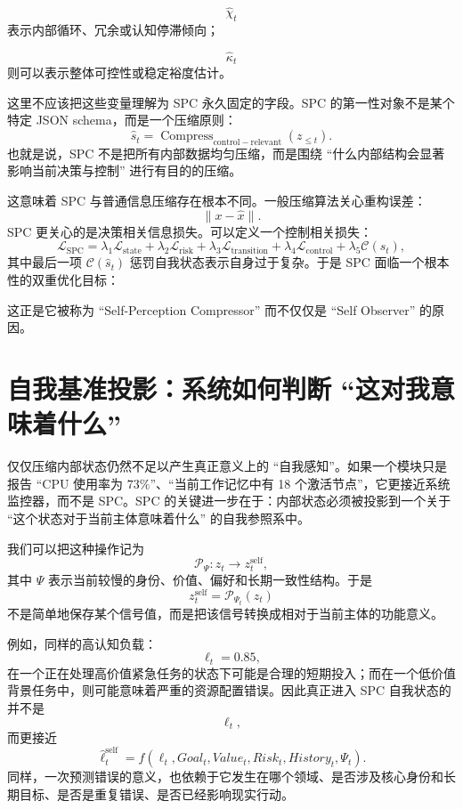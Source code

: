 \[
\hat{\chi}_t
\]
表示内部循环、冗余或认知停滞倾向；

\[
\hat{\kappa}_t
\]
则可以表示整体可控性或稳定裕度估计。

这里不应该把这些变量理解为 SPC 永久固定的字段。SPC 的第一性对象不是某个特定 JSON schema，而是一个压缩原则：
\[
\boxed{
\hat{s}_t
=
\operatorname{Compress}_{\mathrm{control-relevant}}
\left(
z_{\leq t}
\right).
}
\]
也就是说，SPC 不是把所有内部数据均匀压缩，而是围绕 ``什么内部结构会显著影响当前决策与控制'' 进行有目的的压缩。

这意味着 SPC 与普通信息压缩存在根本不同。一般压缩算法关心重构误差：
\[
\|x-\hat{x}\|.
\]
SPC 更关心的是决策相关信息损失。可以定义一个控制相关损失：
\[
\mathcal L_{\mathrm{SPC}}
=
\lambda_1
\mathcal L_{\mathrm{state}}
+
\lambda_2
\mathcal L_{\mathrm{risk}}
+
\lambda_3
\mathcal L_{\mathrm{transition}}
+
\lambda_4
\mathcal L_{\mathrm{control}}
+
\lambda_5
\mathcal C(\hat{s}_t),
\]
其中最后一项 $\mathcal C(\hat{s}_t)$ 惩罚自我状态表示自身过于复杂。于是 SPC 面临一个根本性的双重优化目标：
\begin{statementbox}
\centering
{}
\end{statementbox}
这正是它被称为 ``Self-Perception Compressor'' 而不仅仅是 ``Self Observer'' 的原因。

\section{自我基准投影：系统如何判断 ``这对我意味着什么''}

仅仅压缩内部状态仍然不足以产生真正意义上的 ``自我感知''。如果一个模块只是报告 ``CPU 使用率为 $73\%$''、``当前工作记忆中有 18 个激活节点''，它更接近系统监控器，而不是 SPC。SPC 的关键进一步在于：内部状态必须被投影到一个关于 ``这个状态对于当前主体意味着什么'' 的自我参照系中。

我们可以把这种操作记为
\[
\mathcal P_{\Psi}:
z_t
\longrightarrow
z_t^{\mathrm{self}},
\]
其中 $\Psi$ 表示当前较慢的身份、价值、偏好和长期一致性结构。于是
\[
z_t^{\mathrm{self}}
=
\mathcal P_{\Psi_t}
\left(
z_t
\right)
\]
不是简单地保存某个信号值，而是把该信号转换成相对于当前主体的功能意义。

例如，同样的高认知负载：
\[
\ell_t=0.85,
\]
在一个正在处理高价值紧急任务的状态下可能是合理的短期投入；而在一个低价值背景任务中，则可能意味着严重的资源配置错误。因此真正进入 SPC 自我状态的并不是
\[
\ell_t,
\]
而更接近
\[
\hat{\ell}^{\mathrm{self}}_t
=
f(
\ell_t,
Goal_t,
Value_t,
Risk_t,
History_t,
\Psi_t
).
\]
同样，一次预测错误的意义，也依赖于它发生在哪个领域、是否涉及核心身份和长期目标、是否是重复错误、是否已经影响现实行动。

